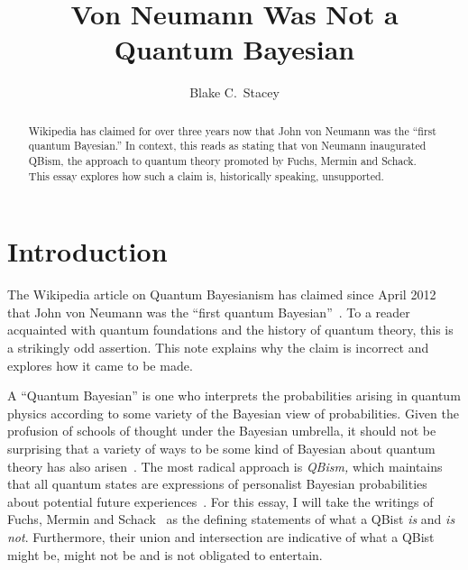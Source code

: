 \documentclass[aps,pra,superscriptaddress,12pt,tightenlines,nofootinbib]{revtex4}
\begin{document}
\title{Von Neumann Was Not a Quantum Bayesian}

\author{Blake C.\ Stacey}


\begin{abstract}
Wikipedia has claimed for over three years now that John von Neumann
was the ``first quantum Bayesian.''  In context, this reads as stating
that von Neumann inaugurated QBism, the approach to quantum theory
promoted by Fuchs, Mermin and Schack.  This essay explores how such a
claim is, historically speaking, unsupported.
\end{abstract}

\maketitle

\section{Introduction}

The Wikipedia article on Quantum Bayesianism has claimed since April
2012 that John von Neumann was the ``first quantum
Bayesian''~\cite{Wikipedia2012}.  To a reader acquainted with quantum
foundations and the history of quantum theory, this is a strikingly
odd assertion.  This note explains why the claim is incorrect and
explores how it came to be made.

A ``Quantum Bayesian'' is one who interprets the probabilities arising
in quantum physics according to some variety of the Bayesian view of
probabilities.  Given the profusion of schools of thought under the
Bayesian umbrella, it should not be surprising that a variety of ways
to be some kind of Bayesian about quantum theory has also
arisen~\cite{Baez2003, Barnum2010, Bub2015, Caticha2007,
  Coecke2012, GellMannHartle2012, Goyal2008, Leifer2006, Leifer2013,
  Pitowsky2003, PortaMana2007, Rau2009, Srednicki2005,
  Warmuth2009}.  The most radical approach is
\emph{QBism,} which maintains that all quantum states are expressions
of personalist Bayesian probabilities about potential future
experiences~\cite{Barnum2010, FuchsPerimeter, FuchsSchack2011,
  Timpson, MerminPT, RMP, AJP, Mermin14, Fuchs2014, Fuchs2014b,
  Stacey2014, Mermin14b, Mermin-Vienna, Mermin-Bell}.  For this essay,
I will take the writings of Fuchs, Mermin and
Schack~\cite{FuchsPerimeter, FuchsSchack2011, RMP, AJP, Fuchs2014,
  Fuchs2014b, MerminPT, Mermin14, Mermin14b, Mermin-Vienna,
  Mermin-Bell} as the defining statements of what a QBist \emph{is}
and \emph{is not}.  Furthermore, their union and intersection are
indicative of what a QBist might be, might not be and is not obligated
to entertain.
\end{document}
